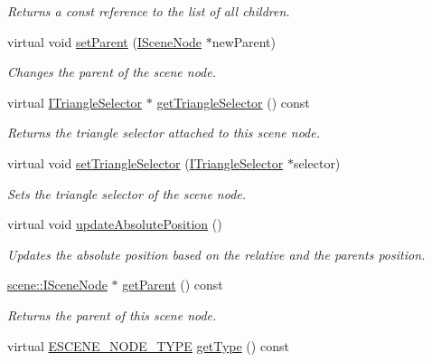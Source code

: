 \begin{DoxyCompactItemize}
\begin{DoxyCompactList}\small\item\em Returns a const reference to the list of all children. \end{DoxyCompactList}\item 
virtual void \hyperlink{classirr_1_1scene_1_1ISceneNode_a59e7f36cb5c9c4895e06fce0ca5eb276}{set\+Parent} (\hyperlink{classirr_1_1scene_1_1ISceneNode}{I\+Scene\+Node} $\ast$new\+Parent)
\begin{DoxyCompactList}\small\item\em Changes the parent of the scene node. \end{DoxyCompactList}\item 
virtual \hyperlink{classirr_1_1scene_1_1ITriangleSelector}{I\+Triangle\+Selector} $\ast$ \hyperlink{classirr_1_1scene_1_1ISceneNode_ab820f7ccfdd317d3913316b6991ea5d9}{get\+Triangle\+Selector} () const
\begin{DoxyCompactList}\small\item\em Returns the triangle selector attached to this scene node. \end{DoxyCompactList}\item 
virtual void \hyperlink{classirr_1_1scene_1_1ISceneNode_a87fb52ec54bf3ae117340d8defd1255f}{set\+Triangle\+Selector} (\hyperlink{classirr_1_1scene_1_1ITriangleSelector}{I\+Triangle\+Selector} $\ast$selector)
\begin{DoxyCompactList}\small\item\em Sets the triangle selector of the scene node. \end{DoxyCompactList}\item 
virtual void \hyperlink{classirr_1_1scene_1_1ISceneNode_aeb6e0dc034bb2101600ce87acbcf0f6e}{update\+Absolute\+Position} ()
\begin{DoxyCompactList}\small\item\em Updates the absolute position based on the relative and the parents position. \end{DoxyCompactList}\item 
\hyperlink{classirr_1_1scene_1_1ISceneNode}{scene\+::\+I\+Scene\+Node} $\ast$ \hyperlink{classirr_1_1scene_1_1ISceneNode_adf77e3715d63e436cc691bf881c4eb5b}{get\+Parent} () const
\begin{DoxyCompactList}\small\item\em Returns the parent of this scene node. \end{DoxyCompactList}\item 
virtual \hyperlink{namespaceirr_1_1scene_acad3d7ef92a9807d391ba29120f3b7bd}{E\+S\+C\+E\+N\+E\+\_\+\+N\+O\+D\+E\+\_\+\+T\+Y\+PE} \hyperlink{classirr_1_1scene_1_1ISceneNode_a3468b09e4afa009d2036efbea9c09b8c}{get\+Type} () const

\end{DoxyCompactItemize}
